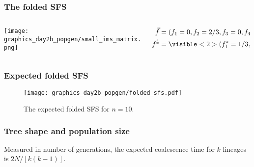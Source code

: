 \documentclass{beamer}
\newcommand{\1}{\ensuremath{\mathbf{1}}}
\begin{document}
%
%
%
\begin{frame}\frametitle{The folded SFS}
	\begin{columns}
	\begin{column}{0.25\textwidth}
	\begin{center}
		\texttt{[image: graphics\_day2b\_popgen/small\_ims\_matrix.png]}
	\end{center}
	\end{column}
	\begin{column}{0.75\textwidth}
		\begin{equation}
			\begin{split}
				\vec{f} & = (f_1=0, f_2=2/3, f_3=0, f_4=1/3)\\
				\vec{f^*} & = \visible<2>{(f_1^* = 1/3, f_2^* = 2/3)}\\
			\end{split}
		\end{equation}
	\end{column}
	\end{columns}
\end{frame}
%
%
%
\begin{frame}\frametitle{Expected folded SFS}
	\begin{figure}
	\begin{center}
		\texttt{[image: graphics\_day2b\_popgen/folded\_sfs.pdf]}
	\end{center}
	\caption{The expected folded SFS for $n=10$.}
	\end{figure}
\end{frame}
%
%
%
\begin{frame}\frametitle{Tree shape and population size}
	Measured in number of generations, the expected coalescence time for $k$ lineages is $2N/[k(k - 1)]$.
	\begin{center}
	\end{center}
\end{frame}
\end{document}
